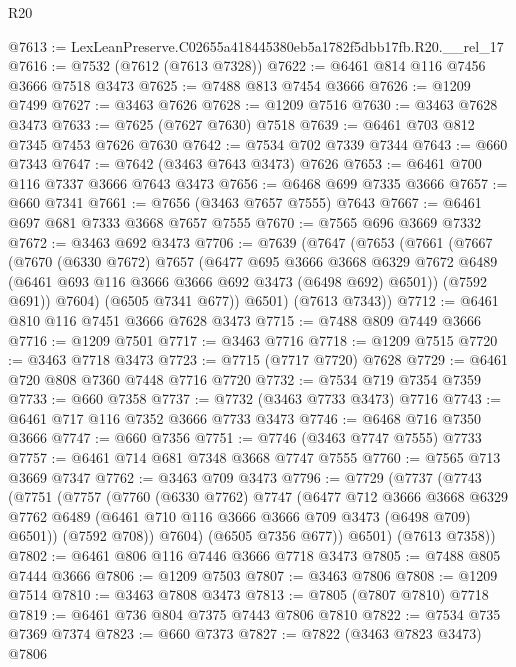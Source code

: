 \begin{lexlean}{R20}
\begin{coremodule}
@7613 := LexLeanPreserve.C02655a418445380eb5a1782f5dbb17fb.R20.__rel_17
@7616 := @7532 (@7612 (@7613 @7328))
@7622 := @6461 @814 @116 @7456 @3666 @7518 @3473
@7625 := @7488 @813 @7454 @3666
@7626 := @1209 @7499
@7627 := @3463 @7626
@7628 := @1209 @7516
@7630 := @3463 @7628 @3473
@7633 := @7625 (@7627 @7630) @7518
@7639 := @6461 @703 @812 @7345 @7453 @7626 @7630
@7642 := @7534 @702 @7339 @7344
@7643 := @660 @7343
@7647 := @7642 (@3463 @7643 @3473) @7626
@7653 := @6461 @700 @116 @7337 @3666 @7643 @3473
@7656 := @6468 @699 @7335 @3666
@7657 := @660 @7341
@7661 := @7656 (@3463 @7657 @7555) @7643
@7667 := @6461 @697 @681 @7333 @3668 @7657 @7555
@7670 := @7565 @696 @3669 @7332
@7672 := @3463 @692 @3473
@7706 := @7639
    (@7647
      (@7653
        (@7661
          (@7667
            (@7670
              (@6330 @7672)
              @7657
              (@6477
                @695
                @3666
                @3668
                @6329
                @7672
                @6489
                (@6461 @693 @116 @3666 @3666 @692 @3473 (@6498 @692) @6501))
              (@7592 @691))
            @7604)
          (@6505 @7341 @677))
        @6501)
      (@7613 @7343))
@7712 := @6461 @810 @116 @7451 @3666 @7628 @3473
@7715 := @7488 @809 @7449 @3666
@7716 := @1209 @7501
@7717 := @3463 @7716
@7718 := @1209 @7515
@7720 := @3463 @7718 @3473
@7723 := @7715 (@7717 @7720) @7628
@7729 := @6461 @720 @808 @7360 @7448 @7716 @7720
@7732 := @7534 @719 @7354 @7359
@7733 := @660 @7358
@7737 := @7732 (@3463 @7733 @3473) @7716
@7743 := @6461 @717 @116 @7352 @3666 @7733 @3473
@7746 := @6468 @716 @7350 @3666
@7747 := @660 @7356
@7751 := @7746 (@3463 @7747 @7555) @7733
@7757 := @6461 @714 @681 @7348 @3668 @7747 @7555
@7760 := @7565 @713 @3669 @7347
@7762 := @3463 @709 @3473
@7796 := @7729
    (@7737
      (@7743
        (@7751
          (@7757
            (@7760
              (@6330 @7762)
              @7747
              (@6477
                @712
                @3666
                @3668
                @6329
                @7762
                @6489
                (@6461 @710 @116 @3666 @3666 @709 @3473 (@6498 @709) @6501))
              (@7592 @708))
            @7604)
          (@6505 @7356 @677))
        @6501)
      (@7613 @7358))
@7802 := @6461 @806 @116 @7446 @3666 @7718 @3473
@7805 := @7488 @805 @7444 @3666
@7806 := @1209 @7503
@7807 := @3463 @7806
@7808 := @1209 @7514
@7810 := @3463 @7808 @3473
@7813 := @7805 (@7807 @7810) @7718
@7819 := @6461 @736 @804 @7375 @7443 @7806 @7810
@7822 := @7534 @735 @7369 @7374
@7823 := @660 @7373
@7827 := @7822 (@3463 @7823 @3473) @7806

\end{coremodule}
\end{lexlean}
